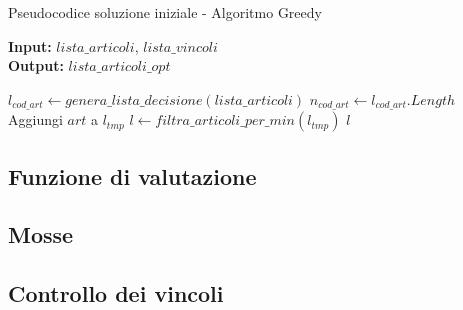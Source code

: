 \begin{algorithm}
    \captionsetup{labelformat=empty}
    \caption{Pseudocodice soluzione iniziale - Algoritmo Greedy}
    \vspace{0.1cm}
    \hspace*{\algorithmicindent} \textbf{Input:} {$lista\_articoli$}, {$lista\_vincoli$}\\
    \hspace*{\algorithmicindent} \textbf{Output:} {$lista\_articoli\_opt$}
    \begin{algorithmic}[1]
        \State $l_{cod\_art} \gets genera\_lista\_decisione(lista\_articoli)$
        \State $n_{cod\_art} \gets l_{cod\_art}.Length$
                    \State Aggiungi $art$ a $l_{tmp}$
                \EndIf
            \EndFor
        \EndWhile
        \State $l \gets filtra\_articoli\_per\_min(l_{tmp})$
        \State \Return $l$
        \EndProcedure
    \end{algorithmic}
\end{algorithm}

\subsection{Funzione di valutazione}
\label{sec:funzione-valutazione}

\subsection{Mosse}
\label{sec:mosse}

\subsection{Controllo dei vincoli}
\label{sec:controllo-vincoli}

